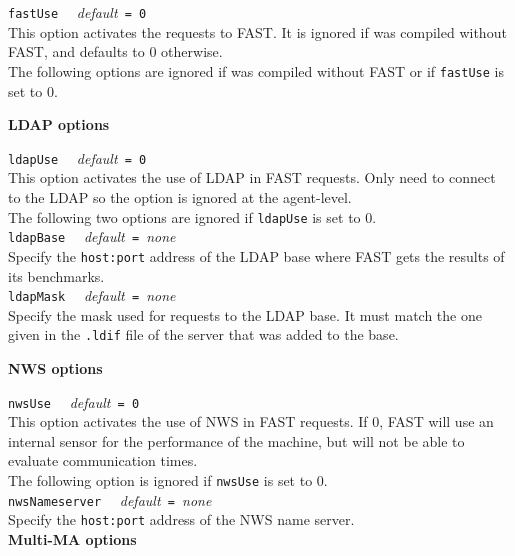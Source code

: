 \noindent
\texttt{fastUse} \ \ \emph{default}\texttt{ = 0}\\ This option
activates the requests to FAST. It is ignored if \diet was compiled
without FAST, and defaults to 0 otherwise. \\

The following options are ignored if \diet was compiled without FAST or if
\texttt{fastUse} is set to 0.

\noindent
\textbf{LDAP options}

\noindent
\texttt{ldapUse} \ \ \emph{default}\texttt{ = 0} \\
This option activates the use of LDAP in FAST requests.  Only \seds
need to connect to the LDAP so the option is ignored at the agent-level. \\

The following two options are ignored if \texttt{ldapUse} is set to 0.
\\

\noindent
\texttt{ldapBase} \ \ \emph{default}\texttt{ = }\emph{none}\\ Specify
the \texttt{host:port} address of the LDAP base where FAST gets the
results of its benchmarks.  \\

\noindent
\texttt{ldapMask} \ \ \emph{default}\texttt{ = }\emph{none}\\ Specify
the mask used for requests to the LDAP base. It must match the one
given in the \texttt{.ldif} file of the server that was added to the
base.


\noindent
\textbf{NWS options}

\noindent
\texttt{nwsUse} \ \ \emph{default}\texttt{ = 0}\\ This option
activates the use of NWS in FAST requests. If 0, FAST will use an
internal sensor for the performance of the machine, but will not be
able to evaluate communication times.  \\

The following option is ignored if \texttt{nwsUse} is set to 0.
\\

\noindent
\texttt{nwsNameserver} \ \ \emph{default}\texttt{ = }\emph{none}\\
Specify the \texttt{host:port} address of the NWS name server.
\\

\noindent
\textbf{Multi-MA options}

\label{sec:multimaconfig}

